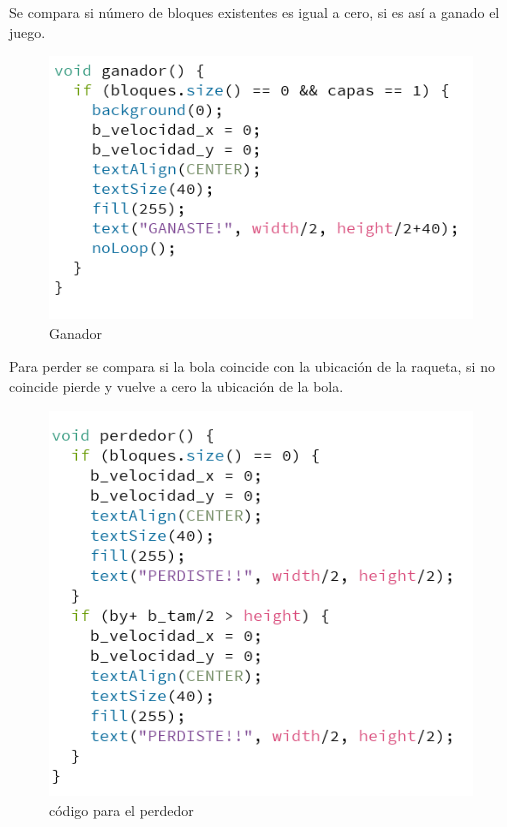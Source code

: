 \documentclass[10pt,a4paper]{article}
\begin{document}
Se compara si número de bloques existentes es igual a cero, si es así a ganado el juego.
\begin{figure}[H]
\centering
\includegraphics[scale=0.6]{ganador.PNG}
\caption{Ganador}
\end{figure}
Para perder se compara si la bola coincide con la ubicación de la raqueta, si no coincide pierde y vuelve a cero la ubicación de la bola.
\begin{figure}[H]
\centering
\includegraphics[scale=0.6]{perder.PNG}
\caption{código para el perdedor}
\end{figure}
\end{document}
